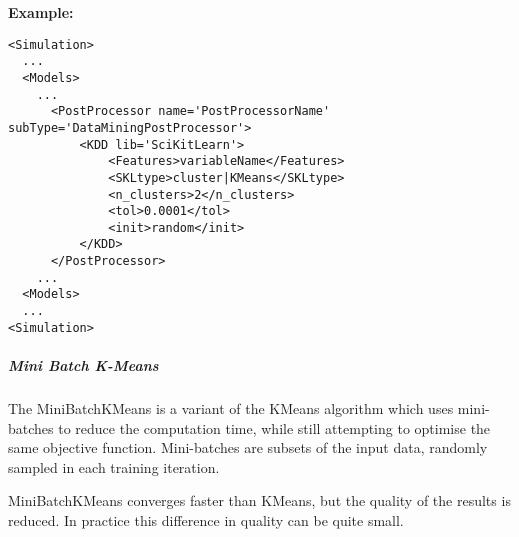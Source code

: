 \textbf{Example:}
\begin{lstlisting}[style=XML,morekeywords={subType}]
<Simulation>
  ...
  <Models>
    ...
      <PostProcessor name='PostProcessorName' subType='DataMiningPostProcessor'>
          <KDD lib='SciKitLearn'>
              <Features>variableName</Features>
              <SKLtype>cluster|KMeans</SKLtype>
              <n_clusters>2</n_clusters>
              <tol>0.0001</tol>
              <init>random</init>
          </KDD>
      </PostProcessor>
    ...
  <Models>
  ...
<Simulation>
\end{lstlisting}


\subparagraph{  Mini Batch K-Means } \hfill
\label{subparagraph:MiniBatch}

The MiniBatchKMeans is a variant of the KMeans algorithm which uses
mini-batches to reduce the computation time, while still attempting
 to optimise the same objective function. Mini-batches are subsets of
 the input data, randomly sampled in each training iteration.

MiniBatchKMeans converges faster than KMeans, but the quality of the
results is reduced. In practice this difference in quality can be
 quite small.

